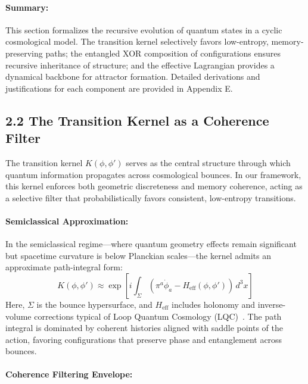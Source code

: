 \paragraph{Summary:}

This section formalizes the recursive evolution of quantum states in a cyclic cosmological model. The transition kernel selectively favors low-entropy, memory-preserving paths; the entangled XOR composition of configurations ensures recursive inheritance of structure; and the effective Lagrangian provides a dynamical backbone for attractor formation. Detailed derivations and justifications for each component are provided in Appendix E.
\subsection*{2.2 The Transition Kernel as a Coherence Filter}

The transition kernel \( K(\phi, \phi') \) serves as the central structure through which quantum information propagates across cosmological bounces. In our framework, this kernel enforces both geometric discreteness and memory coherence, acting as a selective filter that probabilistically favors consistent, low-entropy transitions.

\paragraph{Semiclassical Approximation:}

In the semiclassical regime—where quantum geometry effects remain significant but spacetime curvature is below Planckian scales—the kernel admits an approximate path-integral form:
\begin{equation}
K(\phi, \phi') \approx \exp\left[i \int_{\Sigma} \left(\pi^a \dot{\phi}_a - H_{\text{eff}}(\phi, \phi')\right) \, d^3x\right]
\end{equation}
Here, \( \Sigma \) is the bounce hypersurface, and \( H_{\text{eff}} \) includes holonomy and inverse-volume corrections typical of Loop Quantum Cosmology (LQC)~\cite{ashtekar2006quantum}. The path integral is dominated by coherent histories aligned with saddle points of the action, favoring configurations that preserve phase and entanglement across bounces.

\paragraph{Coherence Filtering Envelope:}

